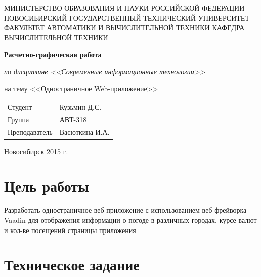 \documentclass{article}
\begin{document}
\begin{center}

МИНИСТЕРСТВО ОБРАЗОВАНИЯ И НАУКИ РОССИЙСКОЙ ФЕДЕРАЦИИ
НОВОСИБИРСКИЙ ГОСУДАРСТВЕННЫЙ ТЕХНИЧЕСКИЙ УНИВЕРСИТЕТ
ФАКУЛЬТЕТ АВТОМАТИКИ И ВЫЧИСЛИТЕЛЬНОЙ ТЕХНИКИ
КАФЕДРА ВЫЧИСЛИТЕЛЬНОЙ ТЕХНИКИ

\vspace{\fill}
{\bfseries \Large Расчетно-графическая работа}

{\itshape по дисциплине <<Современные информационные технологии>>}

на тему <<Одностраничное Web-приложение>>

\vspace{\fill}

\begin{flushleft}
\begin{tabular}{ l l }
Студент & Кузьмин Д.С. \\
Группа & АВТ-318 \\
Преподаватель & Васюткина И.А. \\
\end{tabular}
\end{flushleft}

\vspace{\fill}
Новосибирск 2015 г.
\end{center}
\pagebreak


\tableofcontents
\pagebreak
\section{Цель работы}
\doublespacing

Разработать одностраничное веб-приложение с использованием веб-фрейворка Vaadin для отображения 
информации о погоде в различных городах, курсе валют и кол-ве посещений страницы приложения


\section{Техническое задание}
\doublespacing
\end{document}
